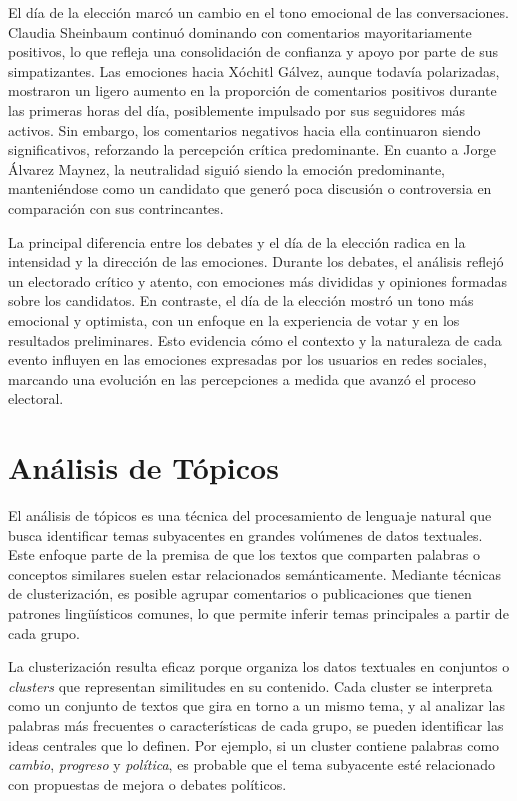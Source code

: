 \documentclass[10pt, a4paper]{article}
\begin{document}
	El día de la elección marcó un cambio en el tono emocional de las conversaciones. Claudia Sheinbaum continuó dominando con comentarios mayoritariamente positivos, lo que refleja una consolidación de confianza y apoyo por parte de sus simpatizantes. Las emociones hacia Xóchitl Gálvez, aunque todavía polarizadas, mostraron un ligero aumento en la proporción de comentarios positivos durante las primeras horas del día, posiblemente impulsado por sus seguidores más activos. Sin embargo, los comentarios negativos hacia ella continuaron siendo significativos, reforzando la percepción crítica predominante. En cuanto a Jorge Álvarez Maynez, la neutralidad siguió siendo la emoción predominante, manteniéndose como un candidato que generó poca discusión o controversia en comparación con sus contrincantes.
	
	La principal diferencia entre los debates y el día de la elección radica en la intensidad y la dirección de las emociones. Durante los debates, el análisis reflejó un electorado crítico y atento, con emociones más divididas y opiniones formadas sobre los candidatos. En contraste, el día de la elección mostró un tono más emocional y optimista, con un enfoque en la experiencia de votar y en los resultados preliminares. Esto evidencia cómo el contexto y la naturaleza de cada evento influyen en las emociones expresadas por los usuarios en redes sociales, marcando una evolución en las percepciones a medida que avanzó el proceso electoral.
	
	
	
	\section{Análisis de Tópicos}
	
	El análisis de tópicos es una técnica del procesamiento de lenguaje natural que busca identificar temas subyacentes en grandes volúmenes de datos textuales. Este enfoque parte de la premisa de que los textos que comparten palabras o conceptos similares suelen estar relacionados semánticamente. Mediante técnicas de clusterización, es posible agrupar comentarios o publicaciones que tienen patrones lingüísticos comunes, lo que permite inferir temas principales a partir de cada grupo.
	
	La clusterización resulta eficaz porque organiza los datos textuales en conjuntos o \textit{clusters} que representan similitudes en su contenido. Cada cluster se interpreta como un conjunto de textos que gira en torno a un mismo tema, y al analizar las palabras más frecuentes o características de cada grupo, se pueden identificar las ideas centrales que lo definen. Por ejemplo, si un cluster contiene palabras como \textit{cambio}, \textit{progreso} y \textit{política}, es probable que el tema subyacente esté relacionado con propuestas de mejora o debates políticos.
	
\end{document}
